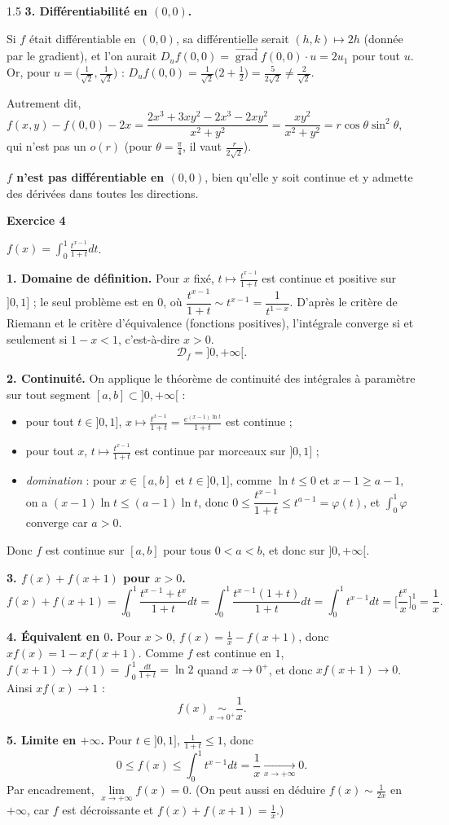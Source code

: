 \documentclass[12pt]{article}
\begin{document}
\begin{spacing}{1.5}
\textbf{3. Différentiabilité en $(0,0)$.}

Si $f$ était différentiable en $(0,0)$, sa différentielle serait $(h,k)\mapsto2h$ (donnée par le gradient), et l'on aurait $D_uf(0,0)=\overrightarrow{\operatorname{grad}}f(0,0)\cdot u=2u_1$ pour tout $u$. Or, pour $u=\big(\frac{1}{\sqrt2},\frac1{\sqrt2}\big)$ : $D_uf(0,0)=\frac1{\sqrt2}\big(2+\frac12\big)=\frac{5}{2\sqrt2}\neq\frac{2}{\sqrt2}$.

Autrement dit, $f(x,y)-f(0,0)-2x=\dfrac{2x^3+3xy^2-2x^3-2xy^2}{x^2+y^2}=\dfrac{xy^2}{x^2+y^2}=r\cos\theta\sin^2\theta$, qui n'est pas un $o(r)$ (pour $\theta=\frac\pi4$, il vaut $\frac{r}{2\sqrt2}$).

\textbf{$f$ n'est pas différentiable en $(0,0)$}, bien qu'elle y soit continue et y admette des dérivées dans toutes les directions.

\medskip\textbf{Exercice 4}

$f(x)=\displaystyle\int_0^1\frac{t^{x-1}}{1+t}dt$.

\textbf{1. Domaine de définition.} Pour $x$ fixé, $t\mapsto\frac{t^{x-1}}{1+t}$ est continue et positive sur $]0,1]$ ; le seul problème est en $0$, où $\dfrac{t^{x-1}}{1+t}\sim t^{x-1}=\dfrac{1}{t^{1-x}}$. D'après le critère de Riemann et le critère d'équivalence (fonctions positives), l'intégrale converge si et seulement si $1-x<1$, c'est-à-dire $x>0$.
\[
\boxed{\mathcal{D}_f=]0,+\infty[}.
\]

\textbf{2. Continuité.} On applique le théorème de continuité des intégrales à paramètre sur tout segment $[a,b]\subset]0,+\infty[$ :
\begin{itemize}
\item pour tout $t\in]0,1]$, $x\mapsto\frac{t^{x-1}}{1+t}=\frac{e^{(x-1)\ln t}}{1+t}$ est continue ;
\item pour tout $x$, $t\mapsto\frac{t^{x-1}}{1+t}$ est continue par morceaux sur $]0,1]$ ;
\item \emph{domination} : pour $x\in[a,b]$ et $t\in]0,1]$, comme $\ln t\le0$ et $x-1\ge a-1$, on a $(x-1)\ln t\le(a-1)\ln t$, donc $0\le\dfrac{t^{x-1}}{1+t}\le t^{a-1}=\varphi(t)$, et $\int_0^1\varphi$ converge car $a>0$.
\end{itemize}
Donc $f$ est continue sur $[a,b]$ pour tous $0<a<b$, et donc sur $]0,+\infty[$.

\textbf{3. $f(x)+f(x+1)$ pour $x>0$.}
\[
f(x)+f(x+1)=\int_0^1\frac{t^{x-1}+t^x}{1+t}dt=\int_0^1\frac{t^{x-1}(1+t)}{1+t}dt=\int_0^1t^{x-1}dt=\Big[\frac{t^x}{x}\Big]_0^1=\boxed{\frac1x}.
\]

\textbf{4. Équivalent en $0$.} Pour $x>0$, $f(x)=\frac1x-f(x+1)$, donc $xf(x)=1-xf(x+1)$. Comme $f$ est continue en $1$, $f(x+1)\to f(1)=\int_0^1\frac{dt}{1+t}=\ln2$ quand $x\to0^+$, et donc $xf(x+1)\to0$. Ainsi $xf(x)\to1$ :
\[
\boxed{f(x)\underset{x\to0^+}{\sim}\frac1x}.
\]

\textbf{5. Limite en $+\infty$.} Pour $t\in]0,1]$, $\frac{1}{1+t}\le1$, donc
\[
0\le f(x)\le\int_0^1t^{x-1}dt=\frac1x\xrightarrow[x\to+\infty]{}0 .
\]
Par encadrement, $\boxed{\lim\limits_{x\to+\infty}f(x)=0}$. (On peut aussi en déduire $f(x)\sim\frac{1}{2x}$ en $+\infty$, car $f$ est décroissante et $f(x)+f(x+1)=\frac1x$.)

\end{spacing}
\end{document}
